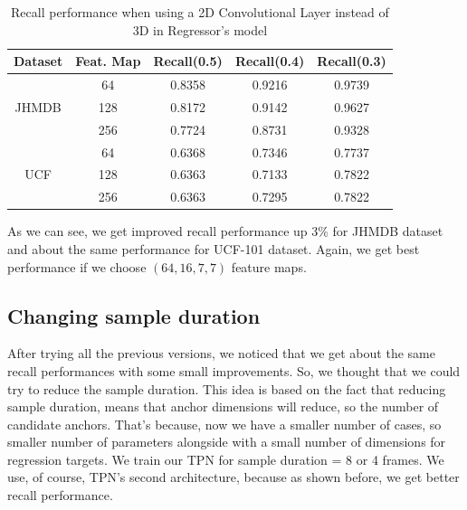 
\begin{table}[h]
  \centering
  \begin{tabular}{||c | c || c  c  c||}
    \hline
    \textbf{Dataset}  & \textbf{Feat. Map} & \textbf{Recall(0.5)} & \textbf{Recall(0.4)} & \textbf{Recall(0.3)}\\
    \hline
    \multirow{3}{*}{JHMDB} & 64 & 0.8358 & 0.9216 & 0.9739\\
    \cline{2-5}
    {} & 128 & 0.8172 & 0.9142 & 0.9627 \\
    \cline{2-5}
    {} & 256 & 0.7724 & 0.8731 & 0.9328 \\
    \hline
    \multirow{3}{*}{UCF} & 64 & 0.6368 & 0.7346 & 0.7737 \\ 
    \cline{2-5}
    {} & 128 & 0.6363 & 0.7133 & 0.7822 \\
    \cline{2-5}
    {} & 256 &  0.6363 & 0.7295 & 0.7822 \\
    \hline

  \end{tabular}
  \caption{Recall performance when using a 2D Convolutional Layer instead of 3D in Regressor's model}
  \label{table:reg_2_2}
\end{table}

As we can see, we get improved recall performance up 3\% for JHMDB dataset and about the same performance for UCF-101 dataset. Again, we get best performance
if we choose $(64, 16, 7, 7)$ feature maps.

\subsection{Changing sample duration}
After trying all the previous versions, we noticed that we get about the same recall performances with some small improvements. So, we thought that we could try
to reduce the sample duration. This idea is based on the fact that reducing sample duration, means that anchor dimensions will reduce, so the number of
candidate anchors. That's because, now we have a smaller number of cases, so smaller number of parameters alongside with a small number of dimensions for regression targets.
We train our TPN for sample duration = 8 or 4 frames. We use, of course, TPN's second  architecture, because as shown before, we get better recall performance.

